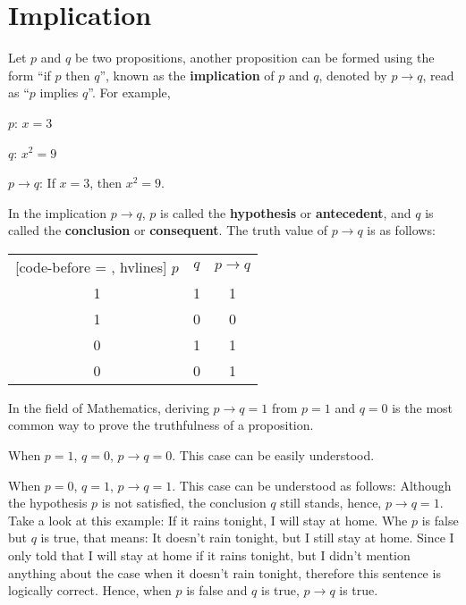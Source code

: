 \documentclass{report}
\newcounter{example}
\begin{document}
\section{Implication}

Let $p$ and $q$ be two propositions, another proposition can be formed using
the form ``if $p$ then $q$'', known as the \textbf{implication} of $p$ and $q$,
denoted by $p \rightarrow q$, read as ``$p$ implies $q$''. For example,

$p$: $x = 3$

$q$: $x^2 = 9$

$p \rightarrow q$: If $x = 3$, then $x^2 = 9$.

\noindent In the implication $p \rightarrow q$, $p$ is called the \textbf{hypothesis} or
\textbf{antecedent}, and $q$ is called the \textbf{conclusion} or
\textbf{consequent}. The truth value of $p \rightarrow q$ is as follows:
\begin{center}
    \begin{NiceTabular}{|c|c|c|}[code-before = , hvlines]
        $p$ & $q$ & $p \rightarrow q$ \\
        1   & 1   & 1                 \\
        1   & 0   & 0                 \\
        0   & 1   & 1                 \\
        0   & 0   & 1                 \\
    \end{NiceTabular}
\end{center}

In the field of Mathematics, deriving $p \rightarrow q = 1$ from $p = 1$ and $q
    = 0$ is the most common way to prove the truthfulness of a proposition.

When $p = 1$, $q = 0$, $p \rightarrow q = 0$. This case can be easily
understood.

When $p = 0$, $q = 1$, $p \rightarrow q = 1$. This case can be understood as
follows: Although the hypothesis $p$ is not satisfied, the conclusion $q$ still
stands, hence, $p \rightarrow q = 1$. Take a look at this example: If it rains
tonight, I will stay at home. Whe $p$ is false but $q$ is true, that means: It
doesn't rain tonight, but I still stay at home. Since I only told that I will
stay at home if it rains tonight, but I didn't mention anything about the case
when it doesn't rain tonight, therefore this sentence is logically correct.
Hence, when $p$ is false and $q$ is true, $p \rightarrow q$ is true.
\end{document}

